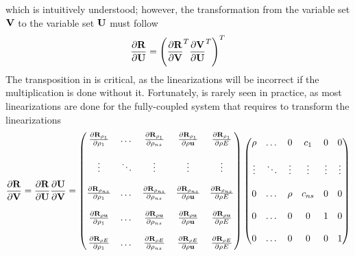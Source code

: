 which is intuitively understood; however, the transformation from the variable
set $\mathbf V$ to the variable set $\mathbf U$ must follow 
\begin{equation}
  \frac{\partial \mathbf R}{\partial \mathbf U} = \left( \frac{\partial \mathbf R}{\partial \mathbf V}^{T} \frac{\partial \mathbf V}{\partial \mathbf U}^{T} \right)^{T}
  \label{r-v-to-u}
\end{equation}
The transposition in  is critical, as the linearizations will be
incorrect if the multiplication is done without it.  Fortunately,
 is rarely seen in practice, as most linearizations are done for
the fully-coupled system that requires  to transform the
linearizations
\begin{equation}
  \begin{aligned}
    \frac{\partial \mathbf R}{\partial \mathbf V} = \frac{\partial \mathbf R}{\partial \mathbf U} \frac{\partial \mathbf U}{\partial \mathbf V} =
    \begin{pmatrix}
      \frac{\partial \mathbf R_{\rho_1}}{\partial \rho_1}    & \dots  & \frac{\partial \mathbf R_{\rho_1}}{\partial \rho_{ns}}    & \frac{\partial \mathbf R_{\rho_1}}{\partial \rho \mathbf u}    & \frac{\partial \mathbf R_{\rho_1}}{\partial \rho E}    \\ \\
      \vdots                    & \ddots & \vdots                       & \vdots                      & \vdots                    \\ \\
      \frac{\partial \mathbf R_{\rho_{ns}}}{\partial \rho_1} & \dots  & \frac{\partial \mathbf R_{\rho_{ns}}}{\partial \rho_{ns}} & \frac{\partial \mathbf R_{\rho_{ns}}}{\partial \rho \mathbf u} & \frac{\partial \mathbf R_{\rho_{ns}}}{\partial \rho E} \\ \\
      \frac{\partial \mathbf R_{\rho \mathbf u}}{\partial \rho_1}  & \dots  & \frac{\partial \mathbf R_{\rho \mathbf u}}{\partial \rho_{ns}}  & \frac{\partial \mathbf R_{\rho \mathbf u}}{\partial \rho \mathbf u}  & \frac{\partial \mathbf R_{\rho \mathbf u}}{\partial \rho E}  \\ \\
      \frac{\partial \mathbf R_{\rho E}}{\partial \rho_1}    & \dots  & \frac{\partial \mathbf R_{\rho E}}{\partial \rho_{ns}}    & \frac{\partial \mathbf R_{\rho E}}{\partial \rho \mathbf u}    & \frac{\partial \mathbf R_{\rho E}}{\partial \rho E}
    \end{pmatrix}
    \begin{pmatrix}
      \rho   & \dots  & 0      & c_1     & 0      & 0      \\ \\
      \vdots & \ddots & \vdots & \vdots  & \vdots & \vdots \\ \\
      0      & \dots  &\rho    & c_{ns}  & 0      & 0      \\ \\
      0      & \dots  &0       & 0       & 1      & 0      \\ \\
      0      & \dots  &0       & 0       & 0      & 1
    \end{pmatrix}
  \end{aligned}
  \label{drdu-to-drdv}
\end{equation}
